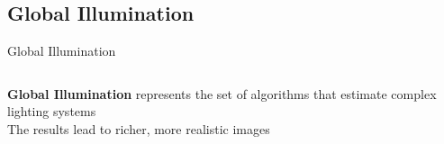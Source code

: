 \documentclass[10pt,handout,compress,professionalfont]{beamer}
\begin{document}
\subsection{Global Illumination}
\begin{frame}{Global Illumination}

    \begin{columns}
        \begin{column}{0.65\textwidth}
            {\bf Global Illumination} represents the set of algorithms that estimate complex lighting systems\\
            \vspace{8mm}
            The results lead to richer, more realistic images\\


\end{column}
\end{columns}
\end{frame}
\end{document}
